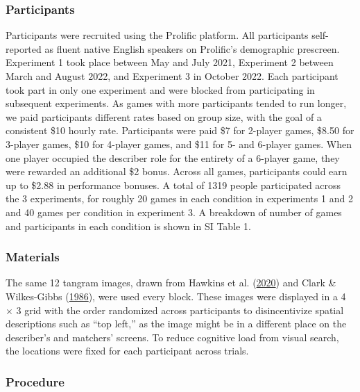 \documentclass[
  english,
]{article}
\begin{document}
\hypertarget{participants}{%
\subsubsection{Participants}\label{participants}}

Participants were recruited using the Prolific platform.
All participants self-reported as fluent native English speakers on Prolific's demographic prescreen.
Experiment 1 took place between May and July 2021, Experiment 2 between March and August 2022, and Experiment 3 in October 2022.
Each participant took part in only one experiment and were blocked from participating in subsequent experiments.
As games with more participants tended to run longer, we paid participants different rates based on group size, with the goal of a consistent \$10 hourly rate. Participants were paid \$7 for 2-player games, \$8.50 for 3-player games, \$10 for 4-player games, and \$11 for 5- and 6-player games. When one player occupied the describer role for the entirety of a 6-player game, they were rewarded an additional \$2 bonus. Across all games, participants could earn up to \$2.88 in performance bonuses. A total of 1319 people participated across the 3 experiments, for roughly 20 games in each condition in experiments 1 and 2 and 40 games per condition in experiment 3. A breakdown of number of games and participants in each condition is shown in SI Table 1.

\hypertarget{materials}{%
\subsubsection{Materials}\label{materials}}

The same 12 tangram images, drawn from Hawkins et al. (\protect\hyperlink{ref-hawkins2020}{2020}) and Clark \& Wilkes-Gibbs (\protect\hyperlink{ref-clark1986}{1986}), were used every block.
These images were displayed in a 4 \(\times\) 3 grid with the order randomized across participants to disincentivize spatial descriptions such as ``top left,'' as the image might be in a different place on the describer's and matchers' screens.
To reduce cognitive load from visual search, the locations were fixed for each participant across trials.

\hypertarget{procedure}{%
\subsubsection{Procedure}\label{procedure}}
\end{document}
